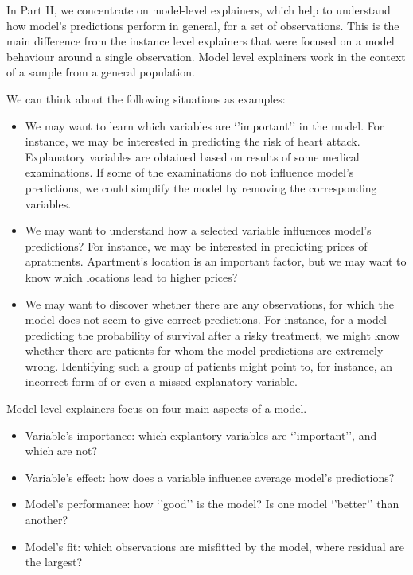 \documentclass[12pt,]{krantz}
\providecommand{\tightlist}{%
  \setlength{\itemsep}{0pt}\setlength{\parskip}{0pt}}
\begin{document}
In Part II, we concentrate on model-level explainers, which help to understand how model's predictions perform in general, for a set of observations. This is the main difference from the instance level explainers that were focused on a model behaviour around a single observation. Model level explainers work in the context of a sample from a general population.

We can think about the following situations as examples:

\begin{itemize}
\tightlist
\item
  We may want to learn which variables are `'important'' in the model. For instance, we may be interested in predicting the risk of heart attack. Explanatory variables are obtained based on results of some medical examinations. If some of the examinations do not influence model's predictions, we could simplify the model by removing the corresponding variables.
\item
  We may want to understand how a selected variable influences model's predictions? For instance, we may be interested in predicting prices of apratments. Apartment's location is an important factor, but we may want to know which locations lead to higher prices?
\item
  We may want to discover whether there are any observations, for which the model does not seem to give correct predictions. For instance, for a model predicting the probability of survival after a risky treatment, we might know whether there are patients for whom the model predictions are extremely wrong. Identifying such a group of patients might point to, for instance, an incorrect form of or even a missed explanatory variable.
\end{itemize}

Model-level explainers focus on four main aspects of a model.

\begin{itemize}
\tightlist
\item
  Variable's importance: which explantory variables are `'important'', and which are not?
\item
  Variable's effect: how does a variable influence average model's predictions?
\item
  Model's performance: how `'good'' is the model? Is one model `'better'' than another?
\item
  Model's fit: which observations are misfitted by the model, where residual are the largest?
\end{itemize}
\end{document}
